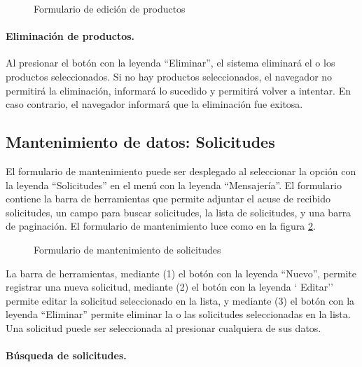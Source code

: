\documentclass[a4paper, 9pt, conference]{article}              %
\begin{document}
\begin{figure}
	\centering
		\caption{Formulario de edici\'on de productos}
	\label{fig:catalogproductsedit}
\end{figure}

\paragraph{Eliminaci\'on de productos.}

Al presionar el bot\'on con la leyenda ``Eliminar'', el sistema eliminar\'a el o los productos seleccionados. Si no hay productos seleccionados, el navegador no permitir\'a la eliminaci\'on, informar\'a lo sucedido y permitir\'a volver a intentar. En caso contrario, el navegador informar\'a que la eliminaci\'on fue exitosa.

\subsection{Mantenimiento de datos: Solicitudes}

El formulario de mantenimiento puede ser desplegado al seleccionar la opci\'on con la leyenda ``Solicitudes'' en el men\'u con la leyenda ``Mensajer\'ia''. El formulario contiene la barra de herramientas que permite adjuntar el acuse de recibido solicitudes, un campo para buscar solicitudes, la lista de solicitudes, y una barra de paginaci\'on. El formulario de mantenimiento luce como en la figura \ref{fig:inforequests}.

\begin{figure}
	\centering
		\caption{Formulario de mantenimiento de solicitudes}
	\label{fig:inforequests}
\end{figure}

La barra de herramientas, mediante (1) el bot\'on con la leyenda ``Nuevo'', permite registrar una nueva solicitud, mediante (2) el bot\'on con la leyenda ` Editar'' permite editar la solicitud seleccionado en la lista, y mediante (3) el bot\'on con la leyenda ``Eliminar'' permite eliminar la o las solicitudes seleccionadas en la lista. Una solicitud puede ser seleccionada al presionar cualquiera de sus datos.

\paragraph{B\'usqueda de solicitudes.}
\end{document}
